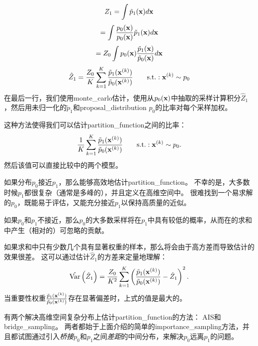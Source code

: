 
\begin{equation}
	Z_1 = \int \tilde{p}_1 (\mathbf{x}) d \mathbf{x} 
\end{equation}
\begin{equation}
	= \int  \frac{ p_0(\mathbf{x}) }{ p_0(\mathbf{x}) }   \tilde{p}_1 (\mathbf{x}) d \mathbf{x} 
\end{equation}
\begin{equation}
	= Z_0 \int  p_0(\mathbf{x})   \frac{ \tilde{p}_1 (\mathbf{x}) }{ \tilde{p}_0 (\mathbf{x}) } d \mathbf{x} 
\end{equation}
\begin{equation}
\label{eq:18.44}
	\hat{Z}_1 = \frac{Z_0}{K} \sum_{k=1}^K \frac{ \tilde{p}_1(\mathbf{x}^{(k)})  }{ \tilde{p}_0(\mathbf{x}^{(k)}) }  \quad\quad \text{s.t.}: \mathbf{x}^{(k)} \sim p_0
\end{equation}
在最后一行，我们使用\gls{monte_carlo}估计，使用从$p_0(\mathbf{x})$中抽取的采样计算积分$\hat{Z}_1$，然后用未归一化的$\tilde{p}_1$和\gls{proposal_distribution} $p_0$的比率对每个采样加权。


这种方法使得我们可以估计\gls{partition_function}之间的比率：
\begin{equation}
	\frac{1}{K} \sum_{k=1}^K \frac{ \tilde{p}_1 (\mathbf{x}^{(k)}) }{ \tilde{p}_0 (\mathbf{x}^{(k)}) }
	\quad\quad \text{s.t.}: \mathbf{x}^{(k)} \sim p_0.
\end{equation}
然后该值可以直接比较中的两个模型。


如果分布$p_0$接近$p_1$，那么能够高效地估计\gls{partition_function}\citep{Minka_2005}。
不幸的是，大多数时候$p_1$都很复杂（通常是多峰的），并且定义在高维空间中。
很难找到一个易求解的$p_0$，既能易于评估，又能充分接近$p_1$以保持高质量的近似。


如果$p_0$和$p_1$不接近，那么$p_0$的大多数采样将在$p_1$中具有较低的概率，从而在的求和中产生（相对的）可忽略的贡献。


如果求和中只有少数几个具有显著权重的样本，那么将会由于高方差而导致估计的效果很差。
这可以通过估计$\hat{Z}_1$的方差来定量地理解：
\begin{equation}
	\hat{\text{Var}} \left( \hat{Z}_1 \right)  = \frac{Z_0 }{K^2} \sum_{k=1}^K
\left(  \frac{ \tilde{p}_1(\mathbf{x}^{(k)}) }{  \tilde{p}_0(\mathbf{x}^{(k)}) } - \hat{Z}_1  \right)^2.
\end{equation}
当重要性权重$\frac{ \tilde{p}_1(\mathbf{x}^{(k)}) }{ \tilde{p}_0(\mathbf{x}^{(k)}) } $存在显著偏差时，上式的值是最大的。


有两个解决高维空间复杂分布上估计\gls{partition_function}的方法：
\gls{AIS}和\gls{bridge_sampling}。
两者都始于上面介绍的简单的\gls{importance_sampling}方法，并且都试图通过引入\emph{桥接}$p_0$和$p_1$之间\emph{差距}的中间分布，来解决$p_0$远离$p_1$的问题。


